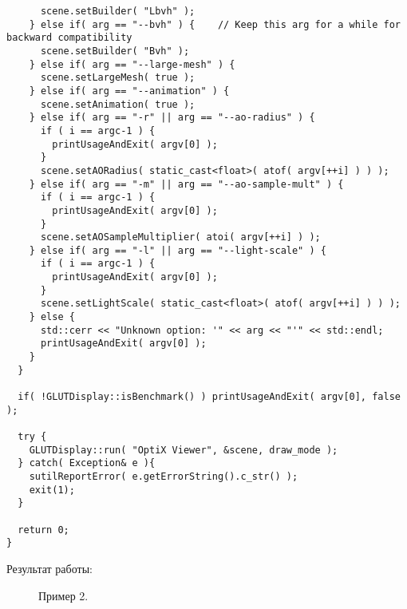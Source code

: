\begin{verbatim}
      scene.setBuilder( "Lbvh" );
    } else if( arg == "--bvh" ) {    // Keep this arg for a while for backward compatibility
      scene.setBuilder( "Bvh" );
    } else if( arg == "--large-mesh" ) {
      scene.setLargeMesh( true );
    } else if( arg == "--animation" ) {
      scene.setAnimation( true );
    } else if( arg == "-r" || arg == "--ao-radius" ) {
      if ( i == argc-1 ) {
        printUsageAndExit( argv[0] );
      }
      scene.setAORadius( static_cast<float>( atof( argv[++i] ) ) );
    } else if( arg == "-m" || arg == "--ao-sample-mult" ) {
      if ( i == argc-1 ) {
        printUsageAndExit( argv[0] );
      }
      scene.setAOSampleMultiplier( atoi( argv[++i] ) );
    } else if( arg == "-l" || arg == "--light-scale" ) {
      if ( i == argc-1 ) {
        printUsageAndExit( argv[0] );
      }
      scene.setLightScale( static_cast<float>( atof( argv[++i] ) ) );
    } else {
      std::cerr << "Unknown option: '" << arg << "'" << std::endl;
      printUsageAndExit( argv[0] );
    }
  }
  
  if( !GLUTDisplay::isBenchmark() ) printUsageAndExit( argv[0], false );

  try {
    GLUTDisplay::run( "OptiX Viewer", &scene, draw_mode );
  } catch( Exception& e ){
    sutilReportError( e.getErrorString().c_str() );
    exit(1);
  }

  return 0;
}
\end{verbatim}

Результат работы:
\begin{figure}[h!]
\caption{Пример 2.}
\label{map}
\end{figure}